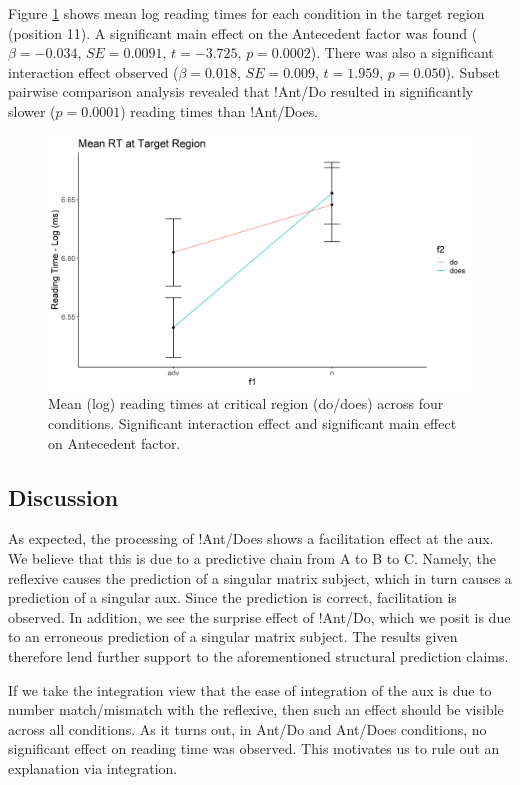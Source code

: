 \documentclass[12pt]{article}
\begin{document}
Figure \ref{fig:reftarget} shows mean log reading times for each condition in the target region (position 11).
A significant main effect on the Antecedent factor was found ($\beta=-0.034$, $SE=0.0091$, $t=-3.725$, $p = 0.0002$).
There was also a significant interaction effect observed ($\beta=0.018$, $SE=0.009$, $t=1.959$, $p=0.050$). Subset pairwise comparison analysis revealed that !Ant/Do resulted in significantly slower ($p = 0.0001$) reading times than !Ant/Does.

\begin{figure}[h!]
    \center
    \includegraphics[scale=0.50]{reftarget.png}
    \caption{Mean (log) reading times at critical region (do/does) across
        four conditions. Significant interaction effect and significant
        main effect on Antecedent factor.}
    \label{fig:reftarget}
\end{figure}

\subsection{Discussion}
As expected, the processing of !Ant/Does shows a facilitation effect at the aux. We believe that this is due to a predictive chain from A to B to C. Namely, the reflexive causes the prediction of a singular matrix subject, which in turn causes a prediction of a singular aux. Since the prediction is correct, facilitation is observed. In addition, we see the surprise effect of !Ant/Do, which we posit is due to an erroneous prediction of a singular matrix subject. The results given therefore lend further support to the aforementioned structural prediction claims.

If we take the integration view that the ease of integration of the aux is due to number match/mismatch with the reflexive, then such an effect should be visible across all conditions. As it turns out, in Ant/Do and Ant/Does conditions, no significant effect on reading time was observed. This motivates us to rule out an explanation via integration. 
\end{document}
